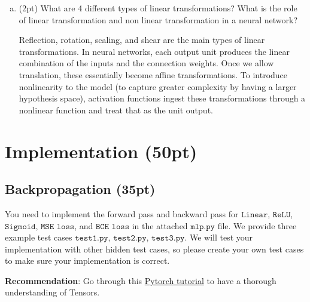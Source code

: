 \documentclass{article}
\begin{document}
\begin{enumerate}[(a)]
  \item (2pt) What are 4 different types of linear transformations? What is the role of linear transformation and non linear transformation in a neural network?
  \begin{tcolorbox}
    Reflection, rotation, scaling, and shear are the main types of
    linear transformations. In neural networks, each output unit produces the
    linear combination of the inputs and the connection weights. Once we allow
    translation, these essentially become affine transformations. To introduce
    nonlinearity to the model (to capture greater complexity by having a larger hypothesis space), activation functions ingest these transformations
    through a nonlinear function and treat that as the unit output.
  \end{tcolorbox}

\end{enumerate}

\section{Implementation (50pt)}

\subsection{Backpropagation (35pt)}
You need to implement the forward pass and backward pass for $\texttt{Linear}$,
$\texttt{ReLU}$, $\texttt{Sigmoid}$, $\texttt{MSE loss}$, and $\texttt{BCE
    loss}$ in the attached $\texttt{mlp.py}$ file. We provide three example test
cases $\texttt{test1.py}$, $\texttt{test2.py}$, $\texttt{test3.py}$. We will
test your implementation with other hidden test cases, so please create your
own test cases to make sure your implementation is correct.

\textbf{Recommendation}: Go through this \href{https://pytorch.org/tutorials/beginner/basics/intro.html}{Pytorch tutorial} to have a thorough understanding of Tensors.
\end{document}
